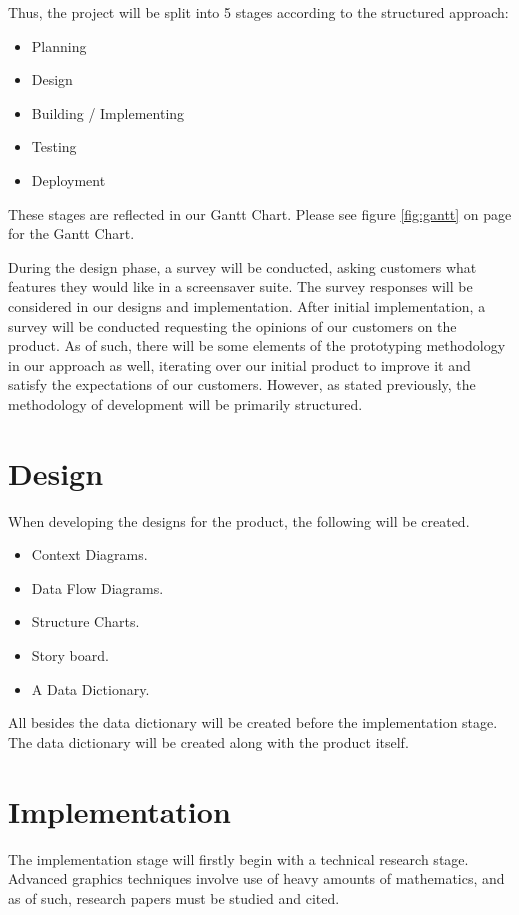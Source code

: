 \documentclass[10pt, openany]{book}
\begin{document}
Thus, the project will be split into 5 stages according to the structured approach:
\begin{itemize}
	\item Planning
	\item Design
	\item Building / Implementing
	\item Testing
	\item Deployment	
\end{itemize}	

These stages are reflected in our Gantt Chart.
Please see figure \ref{fig:gantt} on page \pageref{fig:gantt} for the Gantt Chart.

During the design phase, a survey will be conducted, asking customers what features they would like in a screensaver suite. The survey responses will be considered in our designs and implementation.
After initial implementation, a survey will be conducted requesting the opinions of our customers on the product. As of such, there will be some elements of the prototyping methodology in our approach as well, iterating over our initial product to improve it and satisfy the expectations of our customers. However, as stated previously, the methodology of development will be primarily structured.

\section{Design}
When developing the designs for the product, the following will be created.
\begin{itemize}
	\item Context Diagrams.
	\item Data Flow Diagrams.	
	\item Structure Charts.
	\item Story board.
	\item A Data Dictionary.
\end{itemize}	
All besides the data dictionary will be created before the implementation stage. The data dictionary will be created along with the product itself.  

\section{Implementation}
The implementation stage will firstly begin with a technical research stage. Advanced graphics techniques involve use of heavy amounts of mathematics, and as of such, research papers must be studied and cited.
\end{document}
